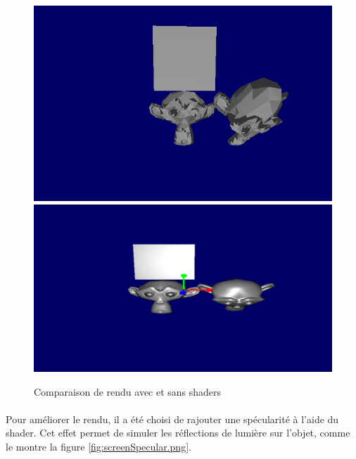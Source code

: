 \begin{figure}[h!]
	\centering
	\includegraphics[scale=0.47]{images/rendu_sans_shader.png}
        \includegraphics[scale=0.3]{images/singe_shaders.png}
	\caption{\label{fig:screenRenduSansShader.png} Comparaison de rendu avec et sans shaders \protect}
\end{figure}

\paragraph{}
Pour améliorer le rendu, il a été choisi de rajouter une spécularité à l'aide du shader. Cet effet permet de simuler les réflections de lumière sur l'objet, comme le montre la figure \ref{fig:screenSpecular.png}.


